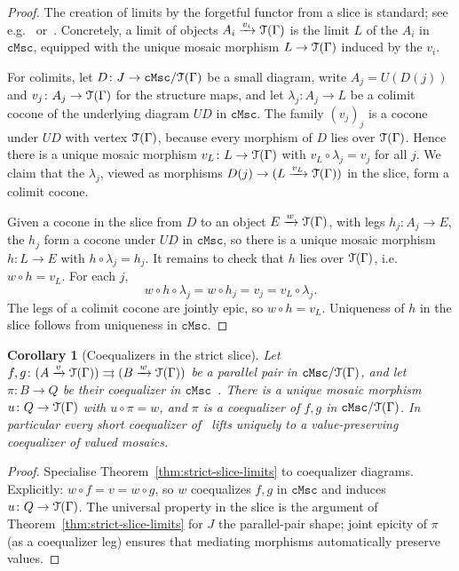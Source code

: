 \documentclass[11pt]{amsart}
\theoremstyle{plain}
\newtheorem{corollary}[theorem]{Corollary}
\theoremstyle{definition}
\theoremstyle{remark}
\newcommand{\T}{\EuScript{T}}
\newcommand{\cMsc}{\mathtt{cMsc}}
\begin{document}
\begin{proof}
The creation of limits by the forgetful functor from a slice is standard; see e.g.~\cite[A1.2]{Joh02} or~\cite[V.6]{ML71}. Concretely, a limit of objects \(A_i\xrightarrow{v_i}\T(\Gamma)\) is the limit \(L\) of the \(A_i\) in \(\cMsc\), equipped with the unique mosaic morphism \(L\to\T(\Gamma)\) induced by the \(v_i\).

For colimits, let \(D\colon J\to\cMsc/\T(\Gamma)\) be a small diagram, write \(A_j=U(D(j))\) and \(v_j\colon A_j\to\T(\Gamma)\) for the structure maps, and let \(\lambda_j\colon A_j\to L\) be a colimit cocone of the underlying diagram \(UD\) in \(\cMsc\). The family \((v_j)_j\) is a cocone under \(UD\) with vertex \(\T(\Gamma)\), because every morphism of \(D\) lies over \(\T(\Gamma)\). Hence there is a unique mosaic morphism \(v_L\colon L\to\T(\Gamma)\) with \(v_L\circ\lambda_j=v_j\) for all \(j\). We claim that the \(\lambda_j\), viewed as morphisms \(D(j)\to(L\xrightarrow{v_L}\T(\Gamma))\) in the slice, form a colimit cocone.

Given a cocone in the slice from \(D\) to an object \(E\xrightarrow{w}\T(\Gamma)\), with legs \(h_j\colon A_j\to E\), the \(h_j\) form a cocone under \(UD\) in \(\cMsc\), so there is a unique mosaic morphism \(h\colon L\to E\) with \(h\circ\lambda_j=h_j\). It remains to check that \(h\) lies over \(\T(\Gamma)\), i.e.\ \(w\circ h=v_L\). For each \(j\),
\[
w\circ h\circ\lambda_j=w\circ h_j=v_j=v_L\circ\lambda_j.
\]
The legs of a colimit cocone are jointly epic, so \(w\circ h=v_L\). Uniqueness of \(h\) in the slice follows from uniqueness in \(\cMsc\).
\end{proof}

\begin{corollary}[Coequalizers in the strict slice]
\label{cor:strict-slice-coeq}
Let \(f,g\colon(A\xrightarrow{v}\T(\Gamma))\rightrightarrows(B\xrightarrow{w}\T(\Gamma))\) be a parallel pair in \(\cMsc/\T(\Gamma)\), and let \(\pi\colon B\to Q\) be their coequalizer in \(\cMsc\)~\cite{NR23}. There is a unique mosaic morphism \(u\colon Q\to\T(\Gamma)\) with \(u\circ\pi=w\), and \(\pi\) is a coequalizer of \(f,g\) in \(\cMsc/\T(\Gamma)\). In particular every short coequalizer of~\cite{NR23} lifts uniquely to a value-preserving coequalizer of valued mosaics.
\end{corollary}

\begin{proof}
Specialise Theorem~\ref{thm:strict-slice-limits} to coequalizer diagrams. Explicitly: \(w\circ f=v=w\circ g\), so \(w\) coequalizes \(f,g\) in \(\cMsc\) and induces \(u\colon Q\to\T(\Gamma)\). The universal property in the slice is the argument of Theorem~\ref{thm:strict-slice-limits} for \(J\) the parallel-pair shape; joint epicity of \(\pi\) (as a coequalizer leg) ensures that mediating morphisms automatically preserve values.
\end{proof}
\end{document}
